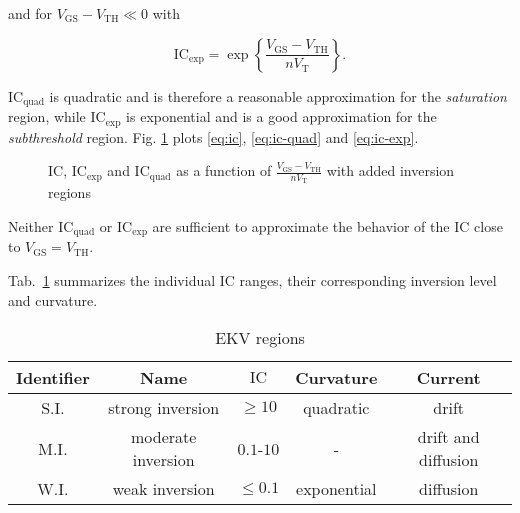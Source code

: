 \documentclass{article}[11pt]
\begin{document}
and for $V_{\mathrm{GS}}-V_{\mathrm{TH}} \ll 0$ with

\begin{equation}\label{eq:ic-exp}
  \mathrm{IC}_{\mathrm{exp}} = \exp\left\{\frac{V_{\mathrm{GS}}-V_{\mathrm{TH}}}{n V_{\mathrm{T}}}\right\}.
\end{equation}

$\mathrm{IC}_{\mathrm{quad}}$ is quadratic and is therefore a 
reasonable approximation for the \textit{saturation} region, while 
$\mathrm{IC}_{\mathrm{exp}}$ is exponential and is a good 
approximation for the \textit{subthreshold} region.
Fig. \ref{fig:plot} plots \eqref{eq:ic}, \eqref{eq:ic-quad} and  
\eqref{eq:ic-exp}.

\begin{figure}[ht]
  \centering
  \begin{tikzpicture}
    
  \end{tikzpicture}
  \caption{$\mathrm{IC}$, $\mathrm{IC}_{\mathrm{exp}}$ and 
    $\mathrm{IC}_{\mathrm{quad}}$ as a function of 
    $\frac{V_{\mathrm{GS}}-V_{\mathrm{TH}}}{n V_{\mathrm{T}}}$ with added 
    inversion regions}
  \label{fig:plot}
\end{figure}

Neither $\mathrm{IC}_{\mathrm{quad}}$ or $\mathrm{IC}_{\mathrm{exp}}$
are sufficient to approximate the behavior of the $\mathrm{IC}$
close to $V_{\mathrm{GS}}=V_{\mathrm{TH}}$.

\bigskip

Tab.~\ref{tab:ekv-regions} summarizes the individual $\mathrm{IC}$ ranges,
their corresponding inversion level and curvature.
\begin{table}[h]
\centering
\caption{EKV regions}
\begin{tabular}{ccccc}
\toprule
Identifier & Name               & $\mathrm{IC}$  & Curvature    & Current             \\ \midrule
S.I.       & strong inversion   & $\geq 10$      & quadratic    & drift               \\ 
M.I.       & moderate inversion & $0.1$-$10$     & -            & drift and diffusion \\ 
W.I.       & weak inversion     & $\leq 0.1$     & exponential  & diffusion           \\ \toprule
\end{tabular}
\label{tab:ekv-regions}
\end{table}

\bigskip
\end{document}
